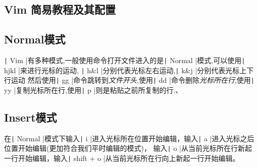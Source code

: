 \documentclass{article}
\newcommand\mintbash[1]{\texttt| #1 |}
\newcommand\bash[1]{\texttt| #1 |}
\begin{document}
\begin{appendices}
    \section{Vim 简易教程及其配置}
    \subsection{Normal模式}
    \mintbash{Vim}有多种模式,一般使用命令打开文件进入的是\mintbash{Normal}模式,可以使用\mintbash{hjkl}来进行光标的运动,
    \mintbash{h&l}分别代表光标左右运动,\mintbash{k&j}分别代表光标上下行运动
    然后使用\mintbash{gg}命令跳转到\emph{文件开头},使用\mintbash{dd}命令删除\emph{光标所在行},使用\mintbash{yy}复制光标所在行,使用\mintbash{p}则是粘贴之前所复制的行.、
\subsection{Insert模式}
在\mintbash{Normal}模式下输入\bash{i}进入光标所在位置开始编辑，输入\bash{a}进入光标之后位置开始编辑(更加符合我们平时编辑的模式)，
输入\bash{o}从当前光标所在行新起一行开始编辑，输入\bash{shift + o}从当前光标所在行向上新起一行开始编辑。

\end{appendices}
\end{document}
